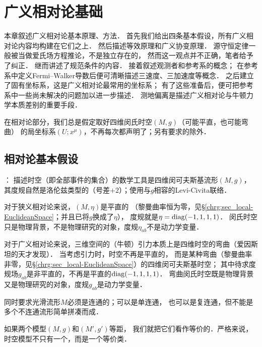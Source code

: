 
\chapter{广义相对论基础}\label{chfd}

本章叙述广义相对论基本原理、方法．
首先我们给出四条基本假设，所有广义相对论内容均构建在它们之上．
然后描述等效原理和广义协变原理．
源守恒定律一般被当做爱氏场方程推论，不是独立存在的，
然而这一观点并不正确，笔者给予了纠正．
继而讲述了规范条件的内容．
接着叙述观测者和参考系的概念；
在参考系中定义Fermi--Walker导数后便可清晰描述三速度、三加速度等概念．
之后建立了固有坐标系，这是广义相对论最常用的坐标系；
有了这些准备后，便可把参考系中一些尚未解决的问题加以进一步描述．
测地偏离是描述广义相对论与牛顿力学本质差别的重要手段．



在相对论部分，我们总是假定取好四维闵氏时空$(M,g)$（可能平直，也可能弯曲）
的局坐标系$(U;x^\mu)$，不再每次都声明了；另有要求的除外．

\section{相对论基本假设}\label{chfd:sec_Fundamental-Postulate}

\noindent{}：
描述时空（即全部事件的集合）的数学工具是四维闵可夫斯基流形$(M,g)$，
其度规自然是洛伦兹类型的（号差$+2$）；使用与$g$相容的Levi-Civita联络．

对于狭义相对论来说，$(M,\eta)$是平直的
（黎曼曲率恒为零，见\S\ref{chrg:sec_local-EuclideanSpace}；并且已将$g$换成了$\eta$），
度规就是$\eta={\rm diag}(-1,1,1,1)$．
闵氏时空只是物理背景，不是物理研究的对象，度规$\eta_{ab}$不是动力学变量．


对于广义相对论来说，三维空间的（牛顿）引力本质上是四维时空的弯曲（爱因斯坦的天才发现）．
当考虑引力时，时空不再是平直的，
而是某种弯曲（黎曼曲率非零，见\S\ref{chrg:sec_local-EuclideanSpace}）的四维闵可夫斯基时空；
其中待求度规场$g_{ab}$是非平直的，不再是平直的${\rm diag}(-1,1,1,1)$．
弯曲闵氏时空既是物理背景又是物理研究的对象，度规$g_{ab}$是动力学变量．

同时要求光滑流形$M$必须是连通的；可以是单连通，
也可以是复连通，但不能是多个不连通流形简单拼凑而成．

如果两个模型$(M,g)$和$(M',g')${\kaishu 等距}，
我们就把它们看作等价的．严格来说，时空模型不只有一个，而是一个等价类．

